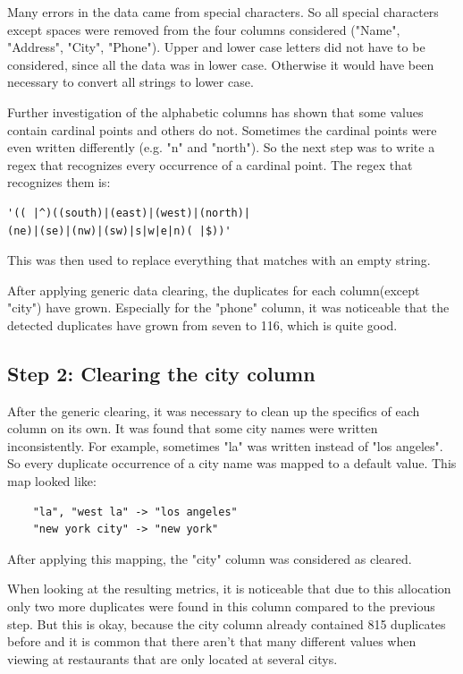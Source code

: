 \documentclass[conference]{IEEEtran}
\begin{document}
Many errors in the data came from special characters. So all special characters except spaces were removed from the four columns considered ("Name", "Address", "City", "Phone"). Upper and lower case letters did not have to be considered, since all the data was in lower case. Otherwise it would have been necessary to convert all strings to lower case.

Further investigation of the alphabetic columns has shown that some values contain cardinal points and others do not. Sometimes the cardinal points were even written differently (e.g. "n" and "north"). So the next step was to write a regex that recognizes every occurrence of a cardinal point. The regex that recognizes them is: 
\begin{lstlisting}
'(( |^)((south)|(east)|(west)|(north)|
(ne)|(se)|(nw)|(sw)|s|w|e|n)( |$))'
\end{lstlisting}
This was then used to replace everything that matches with an empty string.

After applying generic data clearing, the duplicates for each column(except "city") have grown. Especially for the "phone" column, it was noticeable that the detected duplicates have grown from seven to 116, which is quite good.
\subsection{Step 2: Clearing the city column}
After the generic clearing, it was necessary to clean up the specifics of each column on its own. It was found that some city names were written inconsistently. For example, sometimes "la" was written instead of "los angeles". So every duplicate occurrence of a city name was mapped to a default value. This map looked like: 
\begin{lstlisting}
	"la", "west la" -> "los angeles"
	"new york city" -> "new york"
\end{lstlisting}
After applying this mapping, the "city" column was considered as cleared.

When looking at the resulting metrics, it is noticeable that due to this allocation only two more duplicates were found in this column compared to the previous step. But this is okay, because the city column already contained 815 duplicates before and it is common that there aren't that many different values when viewing at restaurants that are only located at several citys.
\end{document}
